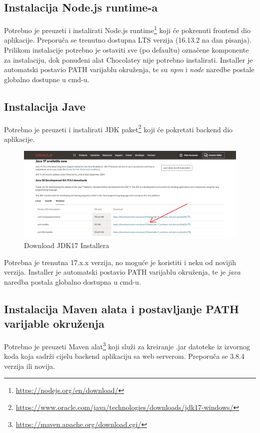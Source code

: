 			\subsection{Instalacija Node.js runtime-a}
			Potrebno je preuzeti i instalirati {Node.js runtime}\footnote{\url{https://nodejs.org/en/download/}} koji će pokrenuti frontend dio aplikacije. Preporuča se trenutno dostupna LTS verzija (16.13.2 na dan pisanja). Prilikom instalacije potrebno je ostaviti sve (po defaultu) označene komponente za instalaciju, dok ponuđeni alat Chocolatey nije potrebno instalirati. Installer je automatski postavio PATH varijablu okruženja, te su \textit{npm} i \textit{node} naredbe postale globalno dostupne u cmd-u.
			\eject
			\subsection{Instalacija Jave}
			Potrebno je preuzeti i instalirati {JDK paket}\footnote{\url{https://www.oracle.com/java/technologies/downloads/jdk17-windows/}} koji će pokretati backend dio aplikacije.
			
			\begin{figure}[H]
			\centering
			\includegraphics[width=\textwidth, scale=0.5]{slike/JDKdownload}
			\caption{Download JDK17 Installera}
			\label{fig:JDKdownload}
			\end{figure}

			Potrebna je trenutna 17.x.x verzija, no moguće je koristiti i neku od novijih verzija. Installer je automatski postavio PATH varijablu okruženja, te je \textit{java} naredba postala globalno dostupna u cmd-u.
			
			\subsection{Instalacija Maven alata i postavljanje PATH varijable okruženja}
			Potrebno je preuzeti {Maven alat}\footnote{\url{https://maven.apache.org/download.cgi/}} koji služi za kreiranje .jar datoteke iz izvornog koda koja sadrži cijelu backend aplikaciju sa web serverom. Preporuča se 3.8.4 verzija ili novija.
			
